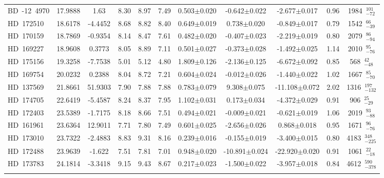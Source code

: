 {\begin{longtable}{lcccccccccc}
\noalign{\smallskip}
BD~-12~4970 & 17.9888 & 1.63 & 8.30 & 8.97 & 7.49 & 0.503$\pm$0.020 & -0.642$\pm$0.022 & -2.677$\pm$0.017 & 0.96 & 1984~$_{-72}^{101}$ \\
\noalign{\smallskip}
HD~172510 & 18.6178 & -4.4452 & 8.68 & 8.82 & 8.40 & 0.649$\pm$0.019 & 0.738$\pm$0.020 & -0.849$\pm$0.017 & 0.79 & 1542~$_{-39}^{66}$ \\
\noalign{\smallskip}
HD~170159 & 18.7869 & -0.9354 & 8.14 & 8.47 & 7.61 & 0.482$\pm$0.020 & -0.407$\pm$0.023 & -2.219$\pm$0.019 & 0.80 & 2079~$_{-94}^{86}$ \\
\noalign{\smallskip}
HD~169227 & 18.9608 & 0.3773 & 8.05 & 8.89 & 7.11 & 0.501$\pm$0.027 & -0.373$\pm$0.028 & -1.492$\pm$0.025 & 1.14 & 2010~$_{-76}^{95}$ \\
\noalign{\smallskip}
HD~175156 & 19.3258 & -7.7538 & 5.01 & 5.12 & 4.80 & 1.809$\pm$0.126 & -2.136$\pm$0.125 & -6.672$\pm$0.092 & 0.85 & 568~$_{-48}^{42}$ \\
\noalign{\smallskip}
HD~169754 & 20.0232 & 0.2388 & 8.04 & 8.72 & 7.21 & 0.604$\pm$0.024 & -0.012$\pm$0.026 & -1.440$\pm$0.022 & 1.02 & 1667~$_{-70}^{85}$ \\
\noalign{\smallskip}
HD~137569 & 21.8661 & 51.9303 & 7.90 & 7.88 & 7.88 & 0.783$\pm$0.079 & 9.308$\pm$0.075 & -11.108$\pm$0.072 & 2.02 & 1316~$_{-132}^{197}$ \\
\noalign{\smallskip}
HD~174705 & 22.6419 & -5.4587 & 8.24 & 8.37 & 7.95 & 1.102$\pm$0.031 & 0.173$\pm$0.034 & -4.372$\pm$0.029 & 0.91 & 906~$_{-29}^{25}$ \\
\noalign{\smallskip}
HD~172403 & 23.5389 & -1.7175 & 8.18 & 8.66 & 7.51 & 0.494$\pm$0.021 & -0.009$\pm$0.021 & -0.621$\pm$0.019 & 1.06 & 2019~$_{-88}^{93}$ \\
\noalign{\smallskip}
HD~161961 & 23.6364 & 12.9011 & 7.71 & 7.80 & 7.49 & 0.601$\pm$0.025 & -2.656$\pm$0.026 & 0.868$\pm$0.018 & 0.95 & 1671~$_{-76}^{96}$ \\
\noalign{\smallskip}
HD~173010 & 23.7322 & -2.4883 & 8.83 & 9.31 & 8.16 & 0.239$\pm$0.016 & -0.155$\pm$0.019 & -3.400$\pm$0.015 & 0.80 & 4183~$_{-225}^{348}$ \\
\noalign{\smallskip}
HD~172488 & 23.9639 & -1.622 & 7.51 & 7.81 & 7.01 & 0.948$\pm$0.020 & -10.891$\pm$0.024 & -22.920$\pm$0.020 & 0.91 & 1061~$_{-18}^{22}$ \\
\noalign{\smallskip}
HD~173783 & 24.1814 & -3.3418 & 9.15 & 9.43 & 8.67 & 0.217$\pm$0.023 & -1.500$\pm$0.022 & -3.957$\pm$0.018 & 0.84 & 4612~$_{-378}^{590}$ \\
\noalign{\smallskip}

\end{longtable}}
